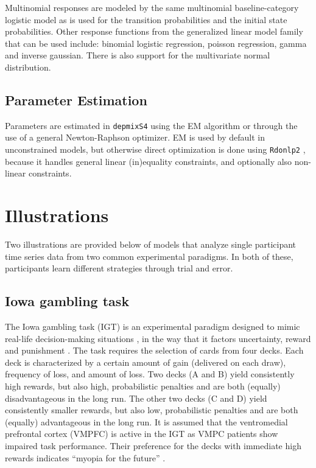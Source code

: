 \documentclass[a4paper,12pt,man]{apa} %
\newcommand{\pkg}{\texttt}
\begin{document}
Multinomial responses are modeled by the same multinomial 
baseline-category logistic model as is used for the transition 
probabilities and the initial state probabilities. Other response 
functions from the generalized linear model family that can be used 
include: binomial logistic regression, poisson regression, gamma and 
inverse gaussian. There is also support for the multivariate normal 
distribution. 



\subsection{Parameter Estimation}

Parameters are estimated in \pkg{depmixS4} using the EM algorithm or
through the use of a general Newton-Raphson optimizer.  EM is used by
default in unconstrained models, but otherwise direct optimization is
done using \pkg{Rdonlp2} \cite{Tamura2007,Spellucci2002}, because it
handles general linear (in)equality constraints, and optionally also
non-linear constraints.


\section{Illustrations}

Two illustrations are provided below of models that analyze single
participant time series data from two common experimental paradigms.
In both of these, participants learn different strategies through
trial and error.

\subsection{Iowa gambling task}

The Iowa gambling task (IGT) is an experimental paradigm designed to
mimic real-life decision-making situations \cite{Bechara1994}, in the
way that it factors uncertainty, reward and punishment
\cite{Dunn2006}.  The task requires the selection of cards from four
decks.  Each deck is characterized by a certain amount of gain
(delivered on each draw), frequency of loss, and amount of loss.  Two
decks (A and B) yield consistently high rewards, but also high,
probabilistic penalties and are both (equally) disadvantageous in the
long run.  The other two decks (C and D) yield consistently smaller
rewards, but also low, probabilistic penalties and are both (equally)
advantageous in the long run.  It is assumed that the ventromedial
prefrontal cortex (VMPFC) is active in the IGT as VMPC patients show
impaired task performance.  Their preference for the decks with
immediate high rewards indicates ``myopia for the future''
\cite{Bechara1994}.
\end{document}
